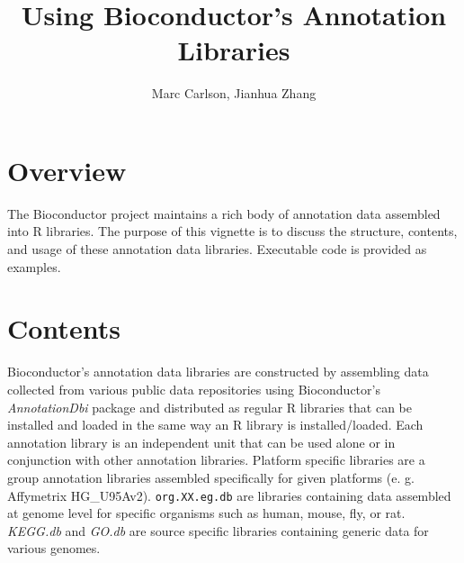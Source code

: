 \documentclass{article}
\newcommand{\Rpackage}[1]{{\textit{#1}}}
\begin{document}

\title{Using Bioconductor's Annotation Libraries}

\author{Marc Carlson, Jianhua Zhang}
\date{}
\maketitle

\section*{Overview}

The Bioconductor project maintains a rich body of annotation data
assembled into R libraries. The purpose of this vignette
is to discuss the structure, contents, and usage of these
annotation data libraries. Executable code is provided as examples.

\section*{Contents}

Bioconductor's annotation data libraries are constructed by assembling data
collected from various public data repositories using Bioconductor's
\Rpackage{AnnotationDbi} package and distributed as regular R libraries that
can be installed and loaded in the same way an R library is
installed/loaded. Each annotation library is an independent unit that can be
used alone or in conjunction with other annotation libraries. Platform
specific libraries are a group annotation libraries assembled specifically for
given platforms (e. g. Affymetrix HG\_U95Av2). \texttt{org.XX.eg.db} are
libraries containing data assembled at genome level for specific organisms
such as human, mouse, fly, or rat. \Rpackage{KEGG.db} and \Rpackage{GO.db} are
source specific libraries containing generic data for various genomes.

\end{document}
